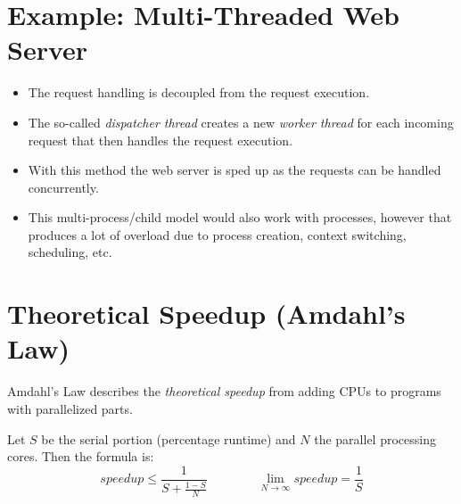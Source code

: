     \section{Example: Multi-Threaded Web Server}
        \begin{itemize}
        	\item The request handling is decoupled from the request execution.
        	\item The so-called \textit{dispatcher thread} creates a new \textit{worker thread} for each incoming request that then handles the request execution.
        	\item With this method the web server is sped up as the requests can be handled concurrently.
        	\item This multi-process/child model would also work with processes, however that produces a lot of overload due to process creation, context switching, scheduling, etc.
        \end{itemize}

    \section{Theoretical Speedup (Amdahl's Law)}
        Amdahl's Law describes the \textit{theoretical speedup} from adding CPUs to programs with parallelized parts.
        
        Let \(S\) be the serial portion (percentage runtime) and \(N\) the parallel processing cores. Then the formula is:
        \begin{equation*}
            \textit{speedup} \leq \frac{1}{S + \frac{1 - S}{N}} \qquad\qquad \lim\limits_{N \rightarrow \infty} \textit{speedup} = \frac{1}{S}
        \end{equation*}

